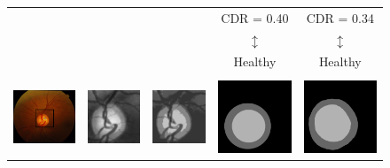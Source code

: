 \begin{figure}[!htbp]
\begin{tabular}{|c c c c c|}
{} & {} & {} & CDR = 0.40 & CDR = 0.34 \\
{} & {} & {} & $\updownarrow$ & $\updownarrow$ \\
{} & {} & {} & Healthy & Healthy \\

\hline

{} & {} & {} & {} & {} \\

\includegraphics[width=3.5cm]{Images/Results/Results/drishti36/od_detect_frame.png} &
\includegraphics[width=3cm]{Images/Results/Results/drishti36/0_crop.png} &
\includegraphics[width=3.0cm]{Images/Results/Results/drishti36/1_kmeans.png} &
\includegraphics[width=3cm]{Images/Results/Results/drishti36/overlay.png} &
\includegraphics[width=3cm]{Images/Results/Results/drishti36/overlay_gt.png} \\


\end{tabular}
\end{figure}
